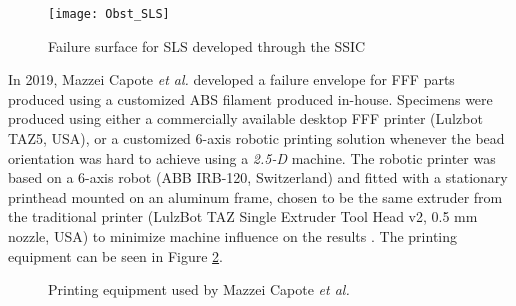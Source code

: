 \documentclass[main.tex]{subfiles}
\begin{document}
\begin{figure}[h]
	\center
	\texttt{[image: Obst\_SLS]}
	\caption{Failure surface for SLS developed through the SSIC \cite{Obst2018}} \label{fig:OOCSLS}
\end{figure}

In 2019, Mazzei Capote \emph{et al.} \cite{MazzeiCapote2019} developed a failure envelope for FFF parts produced using a customized ABS filament produced in-house. Specimens were produced using either a commercially available desktop FFF printer (Lulzbot TAZ5, USA), or a customized 6-axis robotic printing solution whenever the bead orientation was hard to achieve using a \emph{2.5-D} machine. The robotic printer was based on a 6-axis robot (ABB IRB-120, Switzerland) and fitted with a stationary printhead mounted on an aluminum frame, chosen to be the same extruder from the traditional printer (LulzBot TAZ Single Extruder Tool Head v2, 0.5 mm nozzle, USA) to minimize machine influence on the results \cite{VanHulle2017}. The printing equipment can be seen in Figure \ref{fig:PrintEquip}. 

\begin{figure}[h]
	\center
	\hfill
	\caption{Printing equipment used by Mazzei Capote \emph{et al.} \cite{MazzeiCapote2019}} \label{fig:PrintEquip}
\end{figure}


  
% 
% 

\end{document}
